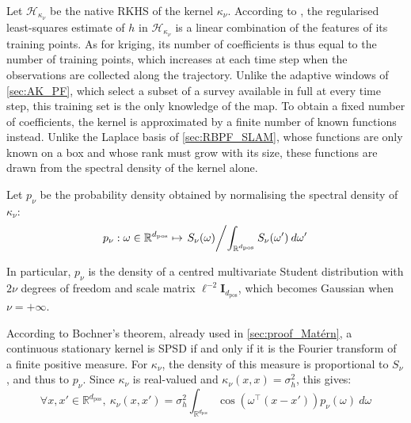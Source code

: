 Let $\mathcal{H}_{\kappa_\nu}$ be the native RKHS of the kernel $\kappa_\nu$. According to , the regularised least-squares estimate of $h$ in $\mathcal{H}_{\kappa_\nu}$ is a linear combination of the features of its training points. As for kriging, its number of coefficients is thus equal to the number of training points, which increases at each time step when the observations are collected along the trajectory. Unlike the adaptive windows of \cref{sec:AK_PF}, which select a subset of a survey available in full at every time step, this training set is the only knowledge of the map. To obtain a fixed number of coefficients, the kernel is approximated by a finite number of known functions instead. Unlike the Laplace basis of \cref{sec:RBPF_SLAM}, whose functions are only known on a box and whose rank must grow with its size, these functions are drawn from the spectral density of the kernel alone.

Let $p_\nu$ be the probability density obtained by normalising the spectral density of $\kappa_\nu$:
\begin{equation}
	p_\nu:\omega\in\mathbb{R}^{d_{\mathrm{pos}}}\mapsto\left.S_\nu(\omega)\middle/\int_{\mathbb{R}^{d_{\mathrm{pos}}}}{S_\nu(\omega')\:d\omega'}\right.
\end{equation}

In particular, $p_\nu$ is the density of a centred multivariate Student distribution with $2\nu$ degrees of freedom and scale matrix $\ell^{-2}\mathbf{I}_{d_{\mathrm{pos}}}$, which becomes Gaussian when $\nu=+\infty$.

According to Bochner's theorem, already used in \cref{sec:proof_Matérn}, a continuous stationary kernel is SPSD if and only if it is the Fourier transform of a finite positive measure. For $\kappa_\nu$, the density of this measure is proportional to $S_\nu$, and thus to $p_\nu$. Since $\kappa_\nu$ is real-valued and $\kappa_\nu(x,x)=\sigma_h^2$, this gives:
\begin{equation}
	\forall x,x'\in\mathbb{R}^{d_{\mathrm{pos}}},\:\kappa_\nu(x,x')=\sigma_h^2\int_{\mathbb{R}^{d_{\mathrm{pos}}}}{\cos\left(\omega^\top(x-x')\right)p_\nu(\omega)\:d\omega}
\end{equation}

